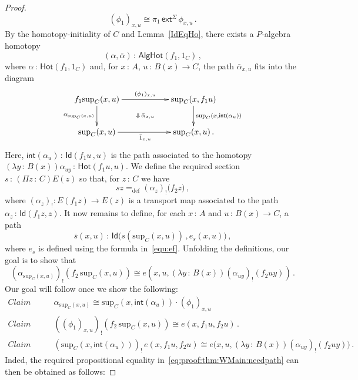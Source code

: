 \documentclass[10pt,a4paper,oneside,reqno]{amsart}
\numberwithin{equation}{section}
\theoremstyle{mythm}
\theoremstyle{mydef}
\theoremstyle{myrmk}
\newcommand{\defeq}{=_{\mathrm{def}}}
\newcommand{\co}{\,{:}\,}
\newcommand{\iso}{\cong}
\newcommand{\ct}{\cdot}
\newcommand{\Hot}{\mathsf{Hot}}
\newcommand{\ext}{\mathsf{ext}}
\renewcommand{\int}{\mathsf{int}}
\newcommand{\Id}{\mathsf{Id}}
\renewcommand{\sup}{\mathrm{sup}}
\newcommand{\AlgHot}{\mathsf{AlgHot}}
\begin{document}
\begin{proof}
\begin{equation}
\label{equ:smallkey}
(\phi_1)_{x,u} \iso   \pi_1\, \ext^\Sigma \, \phi_{x,u}   \, .
\end{equation}
By the homotopy-initiality of $C$ and Lemma~\ref{IdEqHo}, there exists a $P$-algebra 
homotopy 
\[
(\alpha, \bar{\alpha}) \co \AlgHot(f_1 , 1_C) \, ,
\]
where  $\alpha \co \Hot( f_1 , 1_C)$ and, for $x \co A$, $u \co B(x) \to C$, the path
$\bar{\alpha}_{x,u}$ fits into the diagram
\begin{equation}
\label{equ:alphabar}
{\vcenter{\hbox{\xymatrix@C=2cm{
f_1 \sup_C(x,u)
 \ar[r]^{(\phi_1)_{x,u}} \ar[d]_{\alpha_{\sup_C(x,u)}}  
\ar@{}[dr]|{\Downarrow \, \bar{\alpha}_{x,u}} & \sup_C(x, f_1 u) \ar[d]^{\sup_C(x, \int(\alpha_u))}  \\ 
\sup_C(x,u) \ar[r]_{\bar{1}_{x,u}} & \sup_C(x,u) \, . }}}}
\end{equation}
Here, $\int(\alpha_u )\co \Id( f_1  u \, ,  u)$ is the path associated to the homotopy
$(\lambda y \co B(x)) \alpha_{u y} \co \Hot( f_1 u , u )$. 
We define the required section $s \co (\Pi z \co C) E(z)$ so that, for $z \co C$ we have
\begin{equation*}
s z \defeq (\alpha_z)_{!} \big(  f_2 z \big) \, ,
\end{equation*}
where  $(\alpha_z)_{!} : E(f_1 z) \to E(z)$ is a transport map associated to the path
$\alpha_z \co \Id( f_1 z,  z)$. It now remains to  define, for each $x \co A$ and $u \co B(x)\to C$, 
a path
\[
\bar{s}(x,u) \co \Id\big(  s(\sup_C(x,u)) \, ,  e_s(x,u)  \big) \, ,
\] 
where $e_s$ is defined using the formula in~\eqref{equ:ef}. 
Unfolding the definitions,  our goal is to show that
\begin{equation}\label{eq:proof:thm:WMain:needpath}
(\alpha_{\sup_C(x,u)})_{!} (  f_2 \, \sup_C(x,u) ) \iso 
e(x, u, (\lambda y \co B(x)) (\alpha_{u y})_{!} ( f_2 u y)   )   \, .
\end{equation}
Our goal will follow once we show the following:
\begin{align*}
\textit{Claim 1.} &  \qquad   \alpha_{\sup_C(x,u)} \iso \sup_C(x, \int(\alpha_u))  \ct (\phi_1)_{x,u}   \\ 
\textit{Claim 2.} &  \qquad  ((\phi_1)_{x,u})_{!} (f_2 \, \sup_C(x,u)) \iso e(x,  f_1 u, f_2 u)    \, . \\ 
\textit{Claim 3.} &  \qquad  (\sup_C(x, \int(\alpha_u)))_{!} \, e(x, f_1 u, f_2 u)  \iso 
e\big(x, u, (\lambda y \co B(x)) (\alpha_{uy})_{!}(f_2 u y) \big) \, . 
\end{align*}
Inded, the required propositional equality in~\eqref{eq:proof:thm:WMain:needpath} can then be obtained as follows:

\end{proof}
\end{document}
